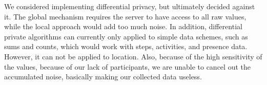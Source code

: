 We considered implementing differential privacy, but ultimately decided against it. The global mechanism requires the server to have access to all raw values, while the local approach would add too much noise. In addition, differential private algorithms can currently only applied to simple data schemes, such as sums and counts, which would work with steps, activities, and presence data. However, it can not be applied to location. Also, because of the high sensitivity of the values, because of our lack of participants, we are unable to cancel out the accumulated noise, basically making our collected data useless.
